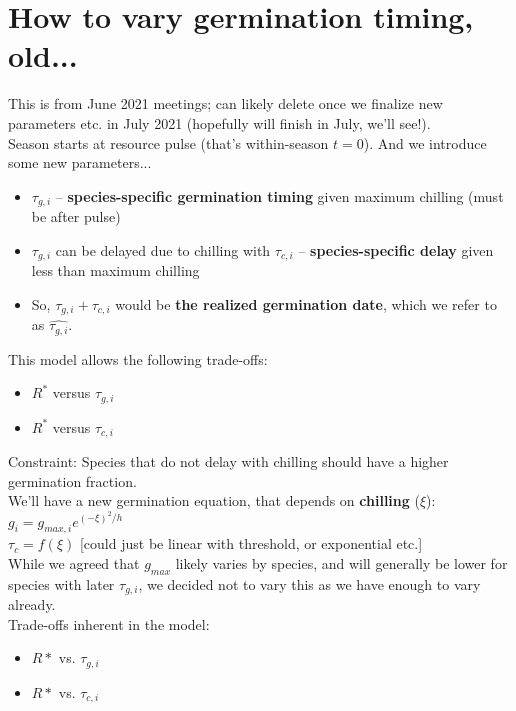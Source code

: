\documentclass[11pt,letter]{article}
\begin{document}
\section{How to vary germination timing, old...} 

This is from June 2021 meetings; can likely delete once we finalize new parameters etc. in July 2021 (hopefully will finish in July, we'll see!).\\

Season starts at resource pulse (that's within-season $t=0$). And we introduce some new parameters...
\begin{itemize}
\item $\tau_{g,i}$ -- {\bf species-specific germination timing} given maximum chilling (must be after pulse)
\item $\tau_{g,i}$ can be delayed due to chilling with $\tau_{c,i}$ -- {\bf species-specific delay} given less than maximum chilling
\item So, $\tau_{g,i} + \tau_{c,i}$ would be {\bf the realized germination date}, which we refer to as $\hat{\tau_{g,i}}$. 
\end{itemize}

This model allows the following trade-offs:
\begin{itemize}
\item $R^*$ versus $\tau_{g,i}$ 
\item $R^*$ versus $\tau_{c,i}$ 
\end{itemize}
Constraint: Species that do not delay with chilling should have a higher germination fraction.\\

We'll have a new germination equation, that depends on {\bf chilling} ($\xi$):
$g_i = g_{max, i}e^{(-\xi)^2/h}$\\
$\tau_c = f(\xi)$ [could just be linear with threshold, or exponential etc.]\\

While we agreed that $g_{max}$ likely varies by species, and will generally be lower for species with later $\tau_{g,i}$, we decided not to vary this as we have enough to vary already.\\

Trade-offs inherent in the model:
\begin{itemize}
\item $R*$ vs. $\tau_{g,i}$
\item $R*$ vs. $\tau_{c,i}$
\end{itemize}
\end{document}
